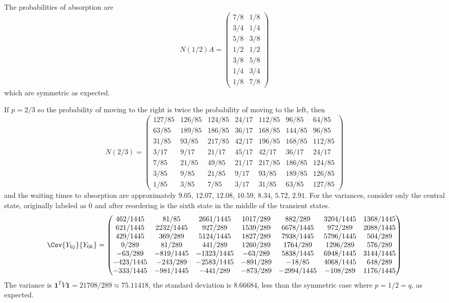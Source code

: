 \documentclass[12pt]{article}
\begin{document}
\begin{example}
    The probabilities of absorption are
    \[
        N(1/2) A =
        \begin{pmatrix}
            7/8 & 1/8\\
            3/4 & 1/4\\
            5/8 & 3/8\\
            1/2 & 1/2\\
            3/8 & 5/8\\
            1/4 & 3/4\\
            1/8 & 7/8
        \end{pmatrix}
    \] which are symmetric as expected.

    If \( p = 2/3 \) so the probability of moving to the right is twice
    the probability of moving to the left, then
    \[
        N(2/3) =
        \begin{pmatrix}
            127/85 & 126/85 & 124/85 & 24/17 & 112/85 & 96/85 & 64/85\\
            63/85 & 189/85 & 186/85 & 36/17 & 168/85 & 144/85 & 96/85\\
            31/85 & 93/85 & 217/85 & 42/17 & 196/85 & 168/85 & 112/85\\
            3/17 & 9/17 & 21/17 & 45/17 & 42/17 & 36/17 & 24/17\\
            7/85 & 21/85 & 49/85 & 21/17 & 217/85 & 186/85 & 124/85\\
            3/85 & 9/85 & 21/85 & 9/17 & 93/85 & 189/85 & 126/85\\
            1/85 & 3/85 & 7/85 & 3/17 & 31/85 & 63/85 & 127/85
        \end{pmatrix}
    \] and the waiting times to absorption are approximately \( 9.05 \),
    \( 12.07 \), \(12.08\), \(10.59\),
    \(8.34\), \(5.72\), \(2.91\). For the
    variances, consider only the central state, originally labeled as \(
    0 \) and after reordering is the sixth state in the middle of the
    transient states.
    \[
        \Cov{Y_{0j}}{Y_{0k}} =
        \begin{pmatrix}
        462/1445 & 81/85 & 2661/1445 & 1017/289 & 882/289 &
          3204/1445 & 1368/1445\\ 
        621/1445 & 2232/1445 & 927/289 & 1539/289 & 6678/1445 & 972/289 &
        2088/1445\\ 
        429/1445 & 369/289 & 5124/1445 & 1827/289 & 7938/1445 & 5796/1445 &
        504/289\\
        9/289 & 81/289 & 441/289 & 1260/289 & 1764/289 & 1296/289 & 576/289\\ 
        -63/289 & -819/1445 & -1323/1445 & -63/289 & 5838/1445 & 6948/1445 &
        3144/1445\\ 
        -423/1445 & -243/289 & -2583/1445 & -891/289 & -18/85 & 4068/1445 &
        648/289\\ 
        -333/1445 & -981/1445 & -441/289 & -873/289 & -2994/1445 & -108/289 &
        1176/1445
        \end{pmatrix}
    \] The variance is \( \mathbf{1}^{T} V \mathbf{1} = 21708/289
    \approx 75.11418 \), the standard deviation is \( 8.66684 \), less
    than the symmetric case where \( p =1/2 = q \), as expected.


\end{example}
\end{document}
